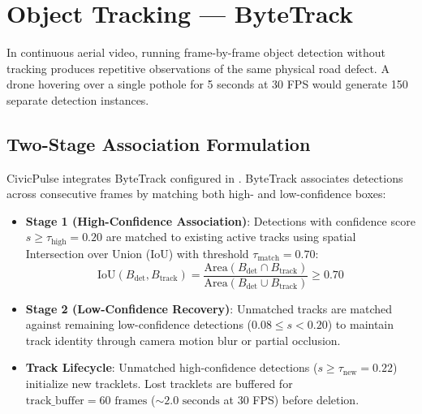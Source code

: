 \documentclass[12pt,a4paper]{article}
\begin{document}
\section{Object Tracking --- ByteTrack}

In continuous aerial video, running frame-by-frame object detection without tracking produces repetitive observations of the same physical road defect. A drone hovering over a single pothole for 5 seconds at 30 FPS would generate 150 separate detection instances.

\subsection{Two-Stage Association Formulation}
CivicPulse integrates ByteTrack configured in . ByteTrack associates detections across consecutive frames by matching both high- and low-confidence boxes:
\begin{itemize}[leftmargin=1.5em, itemsep=0.1em]
    \item \textbf{Stage 1 (High-Confidence Association)}: Detections with confidence score $s \ge \tau_{\text{high}} = 0.20$ are matched to existing active tracks using spatial Intersection over Union (IoU) with threshold $\tau_{\text{match}} = 0.70$:
    \begin{equation}
    \text{IoU}(B_{\text{det}}, B_{\text{track}}) = \frac{\text{Area}(B_{\text{det}} \cap B_{\text{track}})}{\text{Area}(B_{\text{det}} \cup B_{\text{track}})} \ge 0.70
    \end{equation}
    \item \textbf{Stage 2 (Low-Confidence Recovery)}: Unmatched tracks are matched against remaining low-confidence detections ($0.08 \le s < 0.20$) to maintain track identity through camera motion blur or partial occlusion.
    \item \textbf{Track Lifecycle}: Unmatched high-confidence detections ($s \ge \tau_{\text{new}} = 0.22$) initialize new tracklets. Lost tracklets are buffered for $\text{track\_buffer} = 60\text{ frames}$ ($\sim 2.0\text{ seconds}$ at 30 FPS) before deletion.
\end{itemize}
\end{document}
